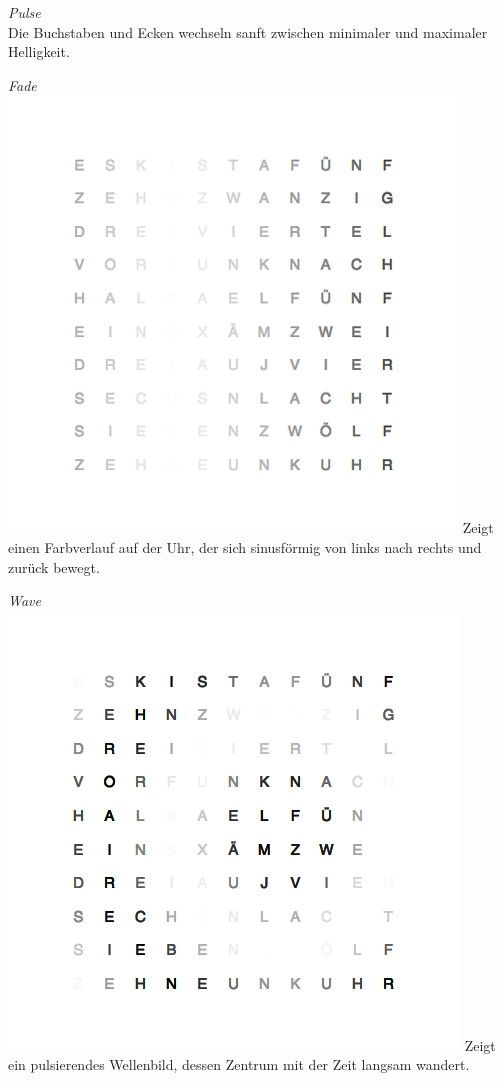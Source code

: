 \begin{multicols}{2}
\emph{Pulse} \\
Die Buchstaben und Ecken wechseln sanft zwischen minimaler und maximaler Helligkeit.

\emph{Fade} \\
\includegraphics[width=\columnwidth]{Abbildungen/Software/Demo/Fade}
Zeigt einen Farbverlauf auf der Uhr, der sich sinusförmig von links nach rechts und zurück bewegt.

\emph{Wave} \\
\includegraphics[width=\columnwidth]{Abbildungen/Software/Demo/Welle}
Zeigt ein pulsierendes Wellenbild, dessen Zentrum mit der Zeit langsam wandert.


\end{multicols}
